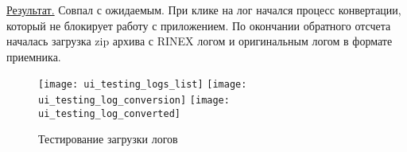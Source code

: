 \underline{Результат.} Совпал с ожидаемым. При клике на лог начался процесс конвертации, который не блокирует работу с приложением. По окончании обратного отсчета началась загрузка zip архива с RINEX логом и оригинальным логом в формате приемника.

\begin{figure}
  \center
  \texttt{[image: ui\_testing\_logs\_list]}
  \texttt{[image: ui\_testing\_log\_conversion]}
  \texttt{[image: ui\_testing\_log\_converted]}
  \caption{Тестирование загрузки логов}
  \label{img:log_download_testing}
\end{figure}


















